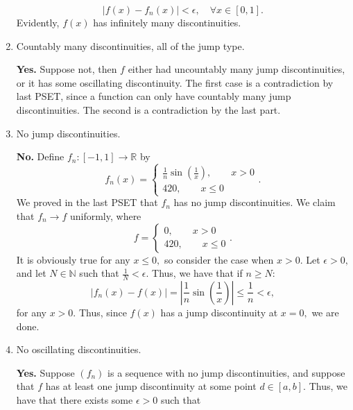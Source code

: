 \documentclass[11pt]{article}
\newcommand{\bbN}{\mathbb{N}}
\newcommand{\bbR}{\mathbb{R}}
\begin{document}
\begin{enumerate}
\begin{solution}
        \[|f(x) - f_n(x)|< \epsilon, \quad \forall x\in [0,1].\] Evidently, $f(x)$ has infinitely many discontinuities.
    \end{solution}
    \item 
    \begin{problem}
        Countably many discontinuities, all of the jump type.
    \end{problem}
    \begin{solution}
    \textbf{Yes.} Suppose not, then $f$ either had uncountably many jump discontinuities, or it has some oscillating discontinuity. The first case is a contradiction by last PSET, since a function can only have countably many jump discontinuities. The second is a contradiction by the last part.
    \end{solution}
    \item 
    \begin{problem}
        No jump discontinuities.
    \end{problem}
    \begin{solution}
     \textbf{No.}
     Define $f_n: [-1,1] \to \bbR$ by
     \[f_n(x) = 
     \begin{cases}
         \frac{1}{n}\sin(\frac{1}{x}), \qquad x> 0\\
         420, \qquad x \leq 0
     \end{cases}.\]
     We proved in the last PSET that $f_n$ has no jump discontinuities. We claim that $f_n \to f$ uniformly, where 
     \[f = \begin{cases}
         0, \qquad x>0\\
         420, \qquad x\leq 0
     \end{cases}.\] 
     It is obviously true for any $x\leq 0,$ so consider the case when $x>0.$ Let $\epsilon>0,$ and let $N\in \bbN$ such that $\frac{1}{N}< \epsilon.$ Thus, we have that if $n\geq N:$
     \[|f_n(x) - f(x)| = |\frac{1}{n}\sin(\frac{1}{x})|\leq \frac{1}{n}< \epsilon,\] for any $x>0.$ Thus, since $f(x)$ has a jump discontinuity at $x = 0,$ we are done.
    \end{solution}
    \item 
    \begin{problem}
        No oscillating discontinuities.
    \end{problem}
    \begin{solution}
        \textbf{Yes.} Suppose $(f_n)$ is a sequence with no jump discontinuities, and suppose that $f$ has at least one jump discontinuity at some point $d \in [a,b].$ Thus, we have that there exists some $\epsilon>0$ such that 

\end{solution}
\end{enumerate}
\end{document}

